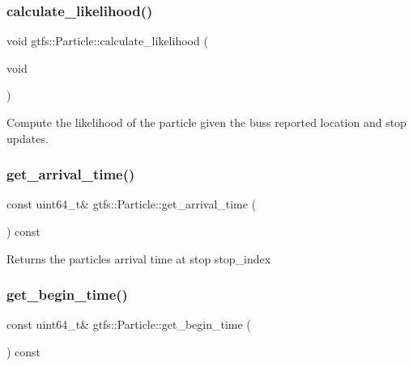 \subsubsection{\texorpdfstring{calculate\+\_\+likelihood()}{calculate\_likelihood()}}
{\footnotesize\ttfamily void gtfs\+::\+Particle\+::calculate\+\_\+likelihood (\begin{DoxyParamCaption}\item[{void}]{ }\end{DoxyParamCaption})}

Compute the likelihood of the particle given the bus\textquotesingle{}s reported location and stop updates. \mbox{\label{classgtfs_1_1Particle_a783d1a0a614dc2c3f18cf269f69ede3d}} 
\subsubsection{\texorpdfstring{get\+\_\+arrival\+\_\+time()}{get\_arrival\_time()}}
{\footnotesize\ttfamily const uint64\+\_\+t\& gtfs\+::\+Particle\+::get\+\_\+arrival\+\_\+time (\begin{DoxyParamCaption}{ }\end{DoxyParamCaption}) const\hspace{0.3cm}{\ttfamily [inline]}}

\begin{DoxyReturn}{Returns}
the particle\textquotesingle{}s arrival time at stop {\ttfamily stop\+\_\+index} 
\end{DoxyReturn}
\mbox{\label{classgtfs_1_1Particle_ac4c8fd3566b0178c95daf6a0cba0040e}} 
\subsubsection{\texorpdfstring{get\+\_\+begin\+\_\+time()}{get\_begin\_time()}}
{\footnotesize\ttfamily const uint64\+\_\+t\& gtfs\+::\+Particle\+::get\+\_\+begin\+\_\+time (\begin{DoxyParamCaption}{ }\end{DoxyParamCaption}) const\hspace{0.3cm}{\ttfamily [inline]}}

